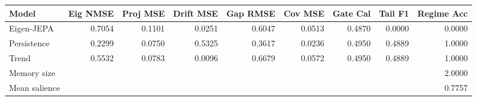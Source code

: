 \begin{tabular}{lrrrrrrrr}
\toprule
Model & Eig NMSE & Proj MSE & Drift MSE & Gap RMSE & Cov MSE & Gate Cal & Tail F1 & Regime Acc \\
\midrule
Eigen-JEPA & 0.7054 & 0.1101 & 0.0251 & 0.6047 & 0.0513 & 0.4870 & 0.0000 & 0.0000 \\
Persistence & 0.2299 & 0.0750 & 0.5325 & 0.3617 & 0.0236 & 0.4950 & 0.4889 & 1.0000 \\
Trend & 0.5532 & 0.0783 & 0.0096 & 0.6679 & 0.0572 & 0.4950 & 0.4889 & 1.0000 \\
\midrule
Memory size & \multicolumn{8}{r}{2.0000} \\
Mean salience & \multicolumn{8}{r}{0.7757} \\
\bottomrule
\end{tabular}